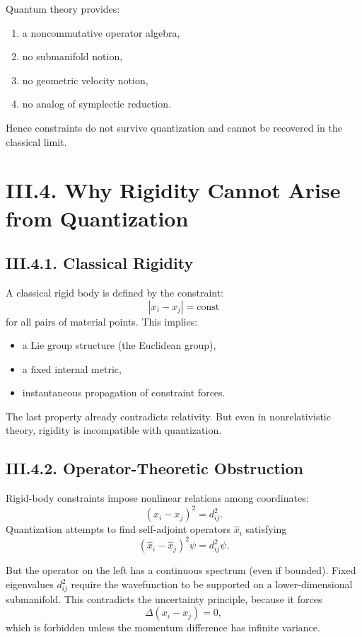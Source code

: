 \documentclass[12pt,oneside]{book}
\theoremstyle{plain}
\theoremstyle{definition}
\begin{document}
Quantum theory provides:

\begin{enumerate}
    \item a noncommutative operator algebra,
    \item no submanifold notion,
    \item no geometric velocity notion,
    \item no analog of symplectic reduction.
\end{enumerate}

Hence constraints do not survive quantization and cannot be recovered in the classical limit.

\section{III.4. Why Rigidity Cannot Arise from Quantization}

\subsection*{III.4.1. Classical Rigidity}

A classical rigid body is defined by the constraint:
\[
|x_i - x_j| = \text{const}
\]
for all pairs of material points. This implies:

\begin{itemize}
    \item a Lie group structure (the Euclidean group),
    \item a fixed internal metric,
    \item instantaneous propagation of constraint forces.
\end{itemize}

The last property already contradicts relativity. But even in nonrelativistic
theory, rigidity is incompatible with quantization.

\subsection*{III.4.2. Operator-Theoretic Obstruction}

Rigid-body constraints impose nonlinear relations among coordinates:
\[
(x_i - x_j)^2 = d_{ij}^2.
\]
Quantization attempts to find self-adjoint operators $\widehat{x}_i$ satisfying
\[
(\widehat{x}_i - \widehat{x}_j)^2 \psi = d_{ij}^2 \psi.
\]

But the operator on the left has a continuous spectrum (even if bounded).
Fixed eigenvalues $d_{ij}^2$ require the wavefunction to be supported on a
lower-dimensional submanifold. This contradicts the uncertainty principle,
because it forces
\[
\Delta(x_i - x_j) = 0,
\]
which is forbidden unless the momentum difference has infinite variance.
\end{document}
